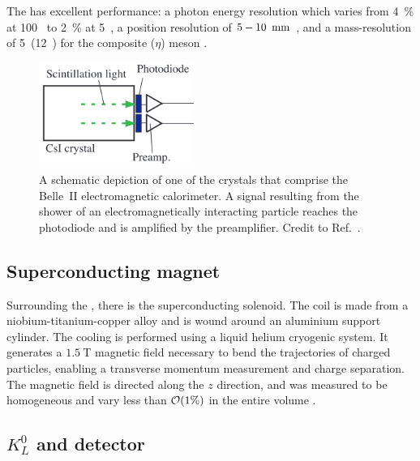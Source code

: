 The \ECL has excellent performance: a photon energy resolution which varies from 4~\% at 100~\mev \cite{Miyabayashi:2020xzp} to 2~\% at 5~\gev \cite{Aulchenko:2015nvy},
a position resolution of $5-10~{\rm \,mm}$ \cite{Miyabayashi:2020xzp}, and a mass-resolution of 5~\mevcc(12~\mevcc) for the composite \piz ($\eta$) meson \cite{Miyabayashi:2020xzp}.

\begin{figure}[htbp!]
    \centering
    \includegraphics[width=0.45\textwidth]{figures/experimental_setup/ecl.png}
    \caption{\label{fig:ecl}
    A schematic depiction of one of the crystals that comprise the Belle~II electromagnetic calorimeter.
    A signal resulting from the shower of an electromagnetically interacting particle reaches the photodiode and is amplified by the preamplifier.
    Credit to Ref.~\cite{Miyabayashi:2020xzp}.
    }
\end{figure}

\subsection{Superconducting magnet}\label{sec:magnet}

Surrounding the \ECL \cite{Belle-II:2010dht}, there is the superconducting solenoid.
The coil is made from a niobium-titanium-copper alloy and is wound around an aluminium support cylinder.
The cooling is performed using a liquid helium cryogenic system.
It generates a $1.5~\mathrm{T}$ magnetic field necessary 
to bend the trajectories of charged particles, 
enabling a transverse momentum measurement and charge separation.
The magnetic field is directed along the $z$ direction, 
and was measured to be homogeneous and vary less than ${\cal O}(1\%)$ in the entire volume \cite{BelleIITrackingGroup:2020hpx}.

\subsection{\texorpdfstring{$K_L^0$}{KL} and \texorpdfstring{\mu}{mu} detector}\label{sec:klm}

